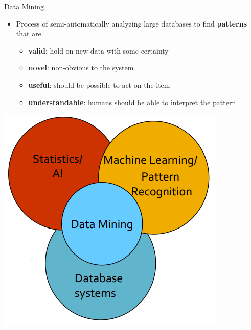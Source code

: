 \documentclass{beamer}
\begin{document}
\begin{frame}{Data Mining}
    \begin{itemize}
        \item Process of semi‐automatically analyzing large databases to find {\bf patterns} that are 
        \begin{itemize}
            \item {\bf valid}: hold on new data with some certainty
            \item {\bf novel}: non‐obvious to the system
            \item {\bf useful}: should  be possible to act on the item
            \item {\bf understandable}: humans should be able to interpret the pattern
        \end{itemize}
    \end{itemize}
\end{frame}
\begin{frame}{}
    \begin{center}
        \includegraphics[scale=0.5]{dataMiningVennDiagram.png}
    \end{center}
\end{frame}
\end{document}
